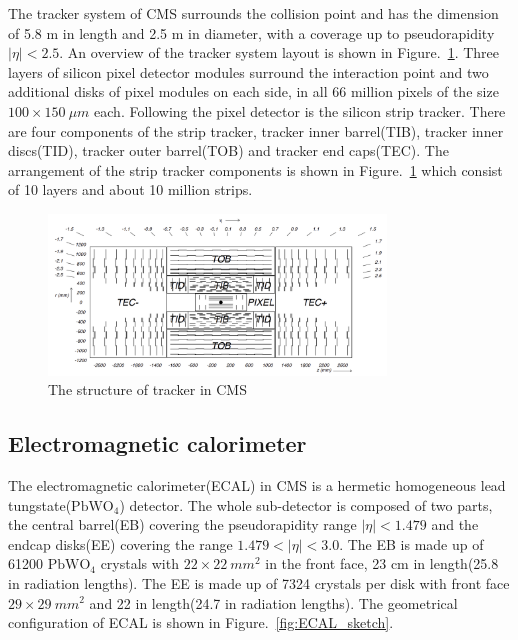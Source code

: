 The tracker system of CMS surrounds the collision point and has the dimension of 5.8 m in length and 2.5 m in diameter, with a coverage up to pseudorapidity $|\eta|<2.5$. An overview of the tracker system layout is shown in Figure.~\ref{fig:tracker_sketch}. Three layers of silicon pixel detector modules surround the interaction point and two additional disks of pixel modules on each side, in all 66 million pixels of the size $100\times150~ \mu m$ each. Following the pixel detector is the silicon strip tracker. There are four components of the strip tracker, tracker inner barrel(TIB), tracker inner discs(TID), tracker outer barrel(TOB) and tracker end caps(TEC). The arrangement of the strip tracker components is shown in Figure.~\ref{fig:tracker_sketch} which consist of 10 layers and about 10 million strips. 


\begin{figure}[htbp] 
\centering
\includegraphics[width=0.8\textwidth]{chapter3/Tracker_structure.png}
\caption{The structure of tracker in CMS~\cite{CMS_experiment}}
\label{fig:tracker_sketch}
\end{figure}



\subsection{Electromagnetic calorimeter}

The electromagnetic calorimeter(ECAL) in CMS is a hermetic homogeneous lead tungstate($\textrm{PbWO}_{4}$) detector. The whole sub-detector is composed of two parts, the central barrel(EB) covering the pseudorapidity range $|\eta|<1.479$ and the endcap disks(EE) covering the range $1.479<|\eta|<3.0$. The EB is made up of 61200 $\textrm{PbWO}_{4}$ crystals with $22\times22~mm^{2}$ in the front face, 23 cm in length(25.8 in radiation lengths). The EE is made up of 7324 crystals per disk with front face $29\times29~mm^{2}$ and 22 in length(24.7 in radiation lengths). The geometrical configuration of ECAL is shown in Figure.~\ref{fig:ECAL_sketch}. 

